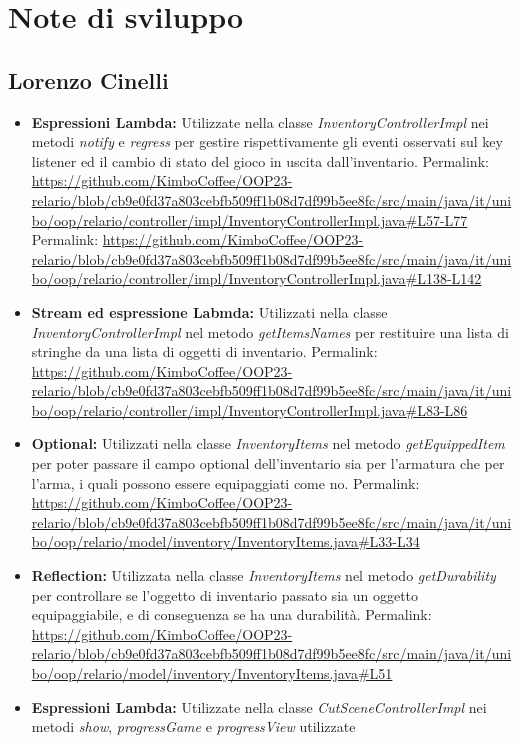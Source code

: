\documentclass[a4paper,12pt]{report}
\begin{document}
\section{Note di sviluppo}

\subsection{Lorenzo Cinelli}

\begin{itemize}
	\item \textbf{Espressioni Lambda:} Utilizzate nella classe \textit{InventoryControllerImpl} nei metodi \textit{notify} e \textit{regress} per gestire rispettivamente
	gli eventi osservati sul key listener ed il cambio di stato del gioco in uscita dall'inventario.
	Permalink: \url{https://github.com/KimboCoffee/OOP23-relario/blob/cb9e0fd37a803cebfb509ff1b08d7df99b5ee8fc/src/main/java/it/unibo/oop/relario/controller/impl/InventoryControllerImpl.java#L57-L77}
	Permalink: \url{https://github.com/KimboCoffee/OOP23-relario/blob/cb9e0fd37a803cebfb509ff1b08d7df99b5ee8fc/src/main/java/it/unibo/oop/relario/controller/impl/InventoryControllerImpl.java#L138-L142}
	\item \textbf{Stream ed espressione Labmda:} Utilizzati nella classe \textit{InventoryControllerImpl} nel metodo \textit{getItemsNames} per restituire una lista di stringhe
	da una lista di oggetti di inventario.
	Permalink: \url{https://github.com/KimboCoffee/OOP23-relario/blob/cb9e0fd37a803cebfb509ff1b08d7df99b5ee8fc/src/main/java/it/unibo/oop/relario/controller/impl/InventoryControllerImpl.java#L83-L86}
	\item \textbf{Optional:} Utilizzati nella classe \textit{InventoryItems} nel metodo \textit{getEquippedItem} per poter passare il campo optional dell'inventario sia per l'armatura
	che per l'arma, i quali possono essere equipaggiati come no.
	Permalink: \url{https://github.com/KimboCoffee/OOP23-relario/blob/cb9e0fd37a803cebfb509ff1b08d7df99b5ee8fc/src/main/java/it/unibo/oop/relario/model/inventory/InventoryItems.java#L33-L34}
	\item \textbf{Reflection:} Utilizzata nella classe \textit{InventoryItems} nel metodo \textit{getDurability} per controllare se l'oggetto di inventario passato sia un oggetto
	equipaggiabile, e di conseguenza se ha una durabilità.
	Permalink: \url{https://github.com/KimboCoffee/OOP23-relario/blob/cb9e0fd37a803cebfb509ff1b08d7df99b5ee8fc/src/main/java/it/unibo/oop/relario/model/inventory/InventoryItems.java#L51}
	\item \textbf{Espressioni Lambda:} Utilizzate nella classe \textit{CutSceneControllerImpl} nei metodi \textit{show}, \textit{progressGame} e \textit{progressView} utilizzate

\end{itemize}
\end{document}
